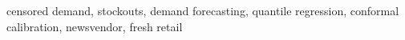 \documentclass[conference,a4paper]{IEEEtran}
\begin{document}
\begin{IEEEkeywords}
censored demand, stockouts, demand forecasting, quantile regression, conformal calibration, newsvendor, fresh retail
\end{IEEEkeywords}










\end{document}
